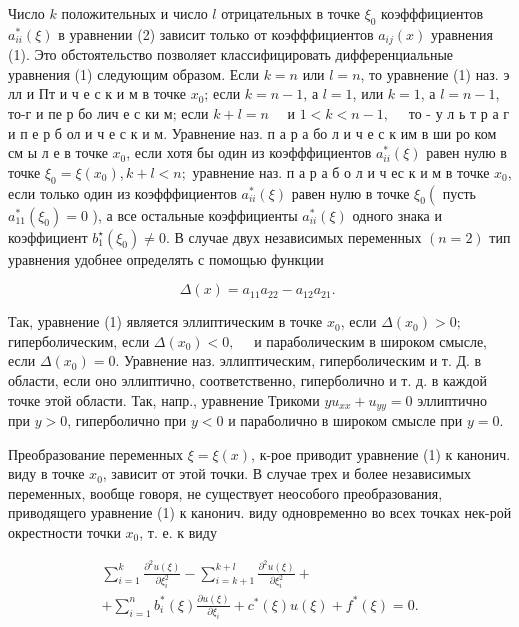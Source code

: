 \documentclass[10pt]{article}
\begin{document}
Число $k$ положительных и число $l$ отрицательных в точке $\xi_{0}$ коэфффициентов $a_{i i}^{*}(\xi)$ в уравнении (2) зависит только от коэфффициентов $a_{i j}(x)$ уравнения (1). Это обстоятельство позволяет классифицировать дифференциальные уравнения (1) следующим образом. Если $k=n$ или $l=n$, то уравнение (1) наз. э лл и Пт и ч е с к и м в точке $x_{0}$; если $k=n-1$, а $l=1$, или $k=1$, а $l=n-1$, то-г и пе р бо лич е с ки м; если $k+l=n \quad$ и $1<k<n-1, \quad$ то - у л ь т р а г и п е р б ол и ч е с к и м. Уравнение наз. п а р а бо л и ч е с к им в ши ро ком см ы л е в точке $x_{0}$, если хотя бы один из коэфффициентов $a_{i i}^{*}(\xi)$ равен нулю в точке $\xi_{0}=\xi\left(x_{0}\right), k+l<n ;$ уравнение наз. п а р а б о л и ч ес к и м в точке $x_{0}$, если только один из коэфффициентов $a_{i i}^{*}(\xi)$ равен нулю в точке $\xi_{0}\left(\right.$ пусть $a_{11}^{*}\left(\xi_{0}\right)=0$ ), а все остальные коэффициенты $a_{i i}^{*}(\xi)$ одного знака и коэффициент $b_{1}^{\star}\left(\xi_{0}\right) \neq 0$. В случае двух независимых переменных $(n=2)$ тип уравнения удобнее определять с помощью функции



\[

\Delta(x)=a_{11} a_{22}-a_{12} a_{21} \text {. }

\]



Так, уравнение (1) является эллиптическим в точке $x_{0}$, если $\Delta\left(x_{0}\right)>0 ;$ гиперболическим, если $\Delta\left(x_{0}\right)<0, \quad$ и параболическим в широком смысле, если $\Delta\left(x_{0}\right)=0$. Уравнение наз. эллиптическим, гиперболическим и т. Д. в области, если оно эллиптично, соответственно, гиперболично и т. д. в каждой точке этой области. Так, напр., уравнение Трикоми $y u_{x x}+u_{y y}=0$ эллиптично при $y>0$, гиперболично при $y<0$ и параболично в широком смысле при $y=0$.



Преобразование переменных $\xi=\xi(x)$, к-рое приводит уравнение (1) к канонич. виду в точке $x_{0}$, зависит от этой точки. В случае трех и более независимых переменных, вообще говоря, не существует неособого преобразования, приводящего уравнение (1) к канонич. виду одновременно во всех точках нек-рой окрестности точки $x_{0}$, т. е. к виду



\[

\begin{gathered}

\sum_{i=1}^{k} \frac{\partial^{2} u(\xi)}{\partial \xi_{i}^{2}}-\sum_{i=k+1}^{k+l} \frac{\partial^{2} u(\xi)}{\partial \xi_{i}^{2}}+ \\

+\sum_{i=1}^{n} b_{i}^{*}(\xi) \frac{\partial u(\xi)}{\partial \xi_{i}}+c^{*}(\xi) u(\xi)+f^{*}(\xi)=0 .

\end{gathered}

\]
\end{document}

